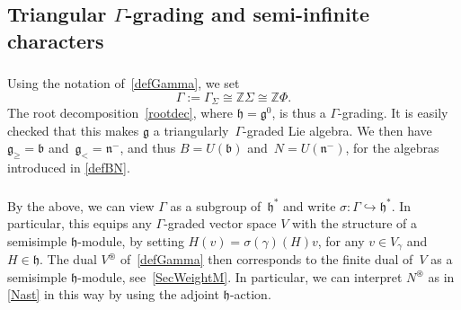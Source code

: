 \documentclass[11pt]{amsart}
\newcommand {\supplus}{\mathop{{\subset}\llap{\raise 0.5pt\hbox{\normalfont\small+}\hskip 0.5pt}}}
\newcommand{\rR}{\Phi}
\newcommand{\fa}{\mathfrak{a}}
\newcommand{\mk}{\Bbbk}
\newcommand{\fn}{\mathfrak{n}}
\newcommand{\fg}{\mathfrak{g}}
\newcommand{\fh}{\mathfrak{h}}
\newcommand{\fb}{\mathfrak{b}}
\newcommand{\mZ}{\mathbb{Z}}
\numberwithin{equation}{section}
\theoremstyle{plain}
\theoremstyle{remark}
\theoremstyle{remark}
\theoremstyle{construction}
\begin{document}
\subsection{Triangular $\Gamma$-grading and semi-infinite characters}



\subsubsection{}
Using the notation of~\ref{defGamma}, we set 
$$\Gamma:=\Gamma_{\Sigma }\cong \mZ\Sigma \cong\mZ\rR.$$
The root decomposition~\eqref{rootdec}, where $\fh=\fg^0$, is thus a $\Gamma$-grading.
It is easily checked that this makes $\fg$ a triangularly~$\Gamma$-graded Lie algebra. We then have $\fg_{\ge}=\fb$ and~$\fg_{<}=\fn^-$, and thus $B=U(\fb)$ and~$N=U(\fn^-)$, for the algebras introduced in \ref{defBN}.


\subsubsection{}By the above, we can view $\Gamma$ as a subgroup of~$\fh^\ast$ {and write} $\sigma:\Gamma\hookrightarrow \fh^\ast$. In particular, this equips any $\Gamma$-graded vector space $V$ with the structure of a semisimple $\fh$-module, by setting $H(v)=\sigma(\gamma)(H)v$, for any $v\in V_\gamma$ and~$H\in\fh$.
The dual $V^{\circledast}$ of~\ref{defGamma} then corresponds to the finite dual of~$V$ as a semisimple $\fh$-module{, see}~\ref{SecWeightM}.
In particular, we can interpret $N^\circledast$ as in \ref{Nast} in this way by using the adjoint $\fh$-action.


\end{document}
